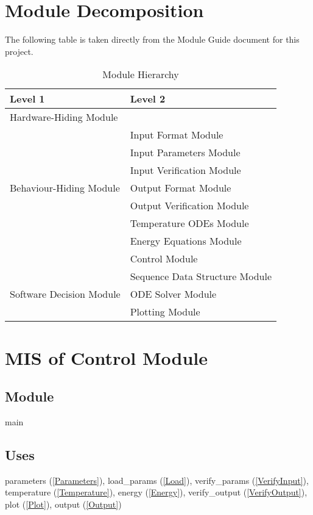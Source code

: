 \documentclass[12pt]{article}
\begin{document}
\section{Module Decomposition}
The following table is taken directly from the Module Guide document for this project.
\begin{table}[!h]
	\centering
	\begin{tabular}{p{} p{}}
		\toprule
		\textbf{Level 1} & \textbf{Level 2}\\
		\midrule
		
		{Hardware-Hiding Module} & ~ \\
		\midrule
		
		\multirow{7}{0.3\textwidth}{Behaviour-Hiding Module} & Input Format Module\\
		& Input Parameters Module\\
		& Input Verification Module\\
		& Output Format Module\\
		& Output Verification Module\\
		& Temperature ODEs Module\\
		& Energy Equations Module\\ 
		& Control Module\\
		\midrule
		
		\multirow{3}{0.3\textwidth}{Software Decision Module} & {Sequence Data Structure Module}\\
		& ODE Solver Module\\
		& Plotting Module\\
		\bottomrule
		
	\end{tabular}
	\caption{Module Hierarchy}
	\label{TblMH}
\end{table}

\section{MIS of Control Module} \label{Main}
\subsection{Module}
main
\subsection{Uses}
parameters (\ref{Parameters}), load\_params (\ref{Load}), verify\_params (\ref{VerifyInput}), temperature (\ref{Temperature}), energy (\ref{Energy}), verify\_output (\ref{VerifyOutput}), plot (\ref{Plot}), output (\ref{Output})
\end{document}
